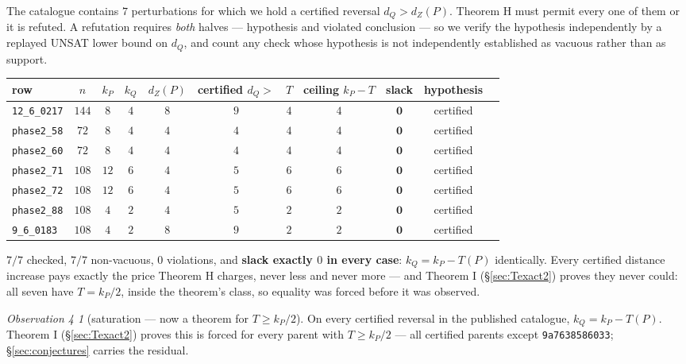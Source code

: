\documentclass[11pt]{article}
\theoremstyle{plain}
\theoremstyle{remark}
\newtheorem*{obsfour}{Observation 4}
\begin{document}
The catalogue contains $7$ perturbations for which we hold a certified reversal
$d_Q>d_Z(P)$. Theorem H must permit every one of them or it is refuted. A refutation
requires \emph{both} halves --- hypothesis and violated conclusion --- so we verify the hypothesis
independently by a replayed UNSAT lower bound on $d_Q$, and count any check whose
hypothesis is not independently established as vacuous rather than as support.

\begin{table}[ht]
\centering
\footnotesize
\begin{tabular}{lcccccccccc}
\toprule
row & $n$ & $k_P$ & $k_Q$ & $d_Z(P)$ & certified $d_Q>$ & $T$ & ceiling $k_P-T$ & slack & hypothesis \\
\midrule
\texttt{12\_6\_0217} & $144$ & $8$ & $4$ & $8$ & $9$ & $4$ & $4$ & $\mathbf{0}$ & certified \\
\texttt{phase2\_58} & $72$ & $8$ & $4$ & $4$ & $4$ & $4$ & $4$ & $\mathbf{0}$ & certified \\
\texttt{phase2\_60} & $72$ & $8$ & $4$ & $4$ & $4$ & $4$ & $4$ & $\mathbf{0}$ & certified \\
\texttt{phase2\_71} & $108$ & $12$ & $6$ & $4$ & $5$ & $6$ & $6$ & $\mathbf{0}$ & certified \\
\texttt{phase2\_72} & $108$ & $12$ & $6$ & $4$ & $5$ & $6$ & $6$ & $\mathbf{0}$ & certified \\
\texttt{phase2\_88} & $108$ & $4$ & $2$ & $4$ & $5$ & $2$ & $2$ & $\mathbf{0}$ & certified \\
\texttt{9\_6\_0183} & $108$ & $4$ & $2$ & $8$ & $9$ & $2$ & $2$ & $\mathbf{0}$ & certified \\
\bottomrule
\end{tabular}
\end{table}

$7/7$ checked, $7/7$ non-vacuous, $0$ violations, and \textbf{slack exactly $0$ in every
case}: $k_Q = k_P - T(P)$ identically. Every certified distance increase pays exactly
the price Theorem H charges, never less and never more --- and Theorem I (\S\ref{sec:Texact2})
proves they never could: all seven have $T=k_P/2$, inside the theorem's class, so
equality was forced before it was observed.

\begin{obsfour}[saturation --- now a theorem for $T\ge k_P/2$]
On every
certified reversal in the published catalogue, $k_Q = k_P - T(P)$. Theorem I
(\S\ref{sec:Texact2}) proves this is forced for every parent with $T\ge k_P/2$ --- all
certified parents except \texttt{9a7638586033}; \S\ref{sec:conjectures} carries the residual.
\end{obsfour}
\end{document}
